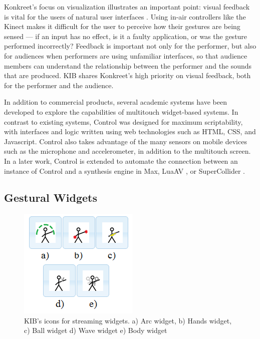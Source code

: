 \documentclass{nime-alternate}
\begin{document}
Konkreet's focus on visualization illustrates an important point: visual feedback is
vital for the users of natural user interfaces \cite{bravenuiworld}. Using in-air controllers like the Kinect
makes it difficult for the user to perceive how their gestures are being sensed --- if an input has no effect, is it
a faulty application, or was the gesture performed incorrectly? Feedback is important not only for the performer, but
also for audiences when performers are using unfamiliar interfaces, so that audience members can understand the relationship
between the performer and the sounds that are produced. KIB shares Konkreet's high priority on visual feedback, both for the performer and the audience. 

In addition to commercial products, several academic systems have been developed to explore the capabilities of multitouch
widget-based systems. In contrast to existing systems, Control \cite{roberts2011control} was designed for maximum 
scriptability, with interfaces and logic written using web technologies such as HTML, CSS, and Javascript. 
Control also takes advantage of the many sensors on mobile devices such
as the microphone and accelerometer, in addition to the multitouch screen. In a later work, Control is 
extended to automate the connection between an instance of Control and a synthesis engine in Max, LuaAV \cite{wakefield2010luaav},
or SuperCollider \cite{roberts2012mobile}.

\subsection{Gestural Widgets}
\begin{figure}
	\centering
		\includegraphics[width=0.6\columnwidth]{figures/icons.png}
	\caption{KIB's icons for streaming widgets. a) Arc widget, b) Hands widget, c) Ball widget
    d) Wave widget e) Body widget}
	\label{fig:widgeticons}
\end{figure}
\end{document}
